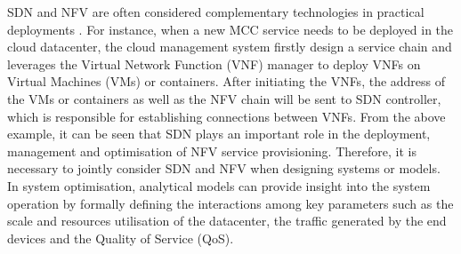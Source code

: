 SDN and NFV are often considered complementary technologies in practical deployments \cite{MatiasGTUJ15}.  For instance, when a new MCC service needs to be deployed in the cloud datacenter, the cloud management system firstly design a service chain and leverages the Virtual Network Function (VNF) manager to deploy VNFs on Virtual Machines (VMs) or containers. After initiating the VNFs, the address of the VMs or containers as well as the NFV chain will be sent to SDN controller, which is responsible for establishing connections between VNFs. From the above example, it can be seen that SDN plays an important role in the deployment, management and optimisation of NFV service provisioning. Therefore, it is necessary to jointly consider SDN and NFV when designing systems or models. In system optimisation, analytical models can provide insight into the system operation by formally defining the interactions among key parameters such as the scale and resources utilisation of the datacenter, the traffic generated by the end devices and the Quality of Service (QoS). 

